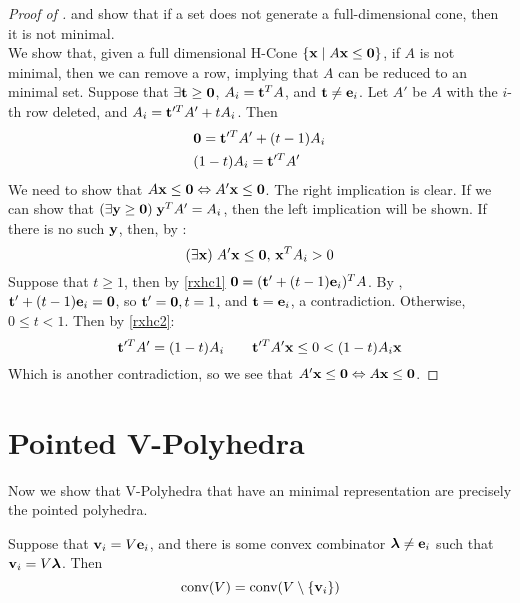 \begin{proof}[Proof of ]
	 and  show that if a set does not generate a full-dimensional cone, then it is not minimal.\\
	We show that, given a full dimensional H-Cone $\left\{\mathbf{x}\;|\; A\mathbf{x}\leq\mathbf{0}\right\}$, if $A$ is not minimal, then we can remove a row, implying that $A$ can be reduced to an minimal set.  Suppose that $\exists\mathbf{t}\geq\mathbf{0}$, $A_i = \mathbf{t}^T A$, and $\mathbf{t}\neq\mathbf{e}_i$.  Let $A'$ be $A$ with the $i$-th row deleted, and $A_i = \mathbf{t}'^T A' + tA_i$.  Then
	\begin{align}
		 & \mathbf{0} = \mathbf{t}'^T A' + (t-1)A_i \label{rxhc1} \\
		 & (1-t)A_i = \mathbf{t}'^T A' \label{rxhc2}
	\end{align}
	We need to show that $A\mathbf{x}\leq\mathbf{0} \Leftrightarrow A'\mathbf{x}\leq\mathbf{0}$.  The right implication is clear.  If we can show that $(\exists\mathbf{y}\geq\mathbf{0})\;\mathbf{y}^T A'=A_i$, then the left implication will be shown.  If there is no such $\mathbf{y}$, then, by :
	\[(\exists\mathbf{x})\; A'\mathbf{x}\leq\mathbf{0},\, \mathbf{x}^T A_i > 0 \]
	Suppose that $t \geq 1$, then by \eqref{rxhc1} $\mathbf{0} = (\mathbf{t}'+(t-1)\mathbf{e}_i)^T A$.  By , $\mathbf{t}'+(t-1)\mathbf{e}_i = \mathbf{0}$, so $\mathbf{t}'=\mathbf{0}, t=1$, and $\mathbf{t} = \mathbf{e}_i$, a contradiction.  Otherwise, $0\leq t < 1$.  Then by \eqref{rxhc2}:
	\[\mathbf{t}'^T A' = (1-t)A_i \quad\quad \mathbf{t}'^T A'\mathbf{x} \leq 0 < (1-t)A_i\mathbf{x} \]
	Which is another contradiction, so we see that $A'\mathbf{x}\leq\mathbf{0} \Leftrightarrow A\mathbf{x}\leq\mathbf{0}$.
\end{proof}

\section{Pointed V-Polyhedra}

Now we show that V-Polyhedra that have an minimal representation are precisely the pointed polyhedra.

\begin{Lemma}\label{reduce_conv}
	Suppose that $\mathbf{v}_i = V\mathbf{e}_i$, and there is some convex combinator $\bm{\lambda} \neq \mathbf{e}_i$ such that $\mathbf{v}_i = V\bm{\lambda}$.  Then
	\[ \operatorname{conv}(V) = \operatorname{conv}(V\setminus\left\{\mathbf{v}_i\right\}) \]
\end{Lemma}

